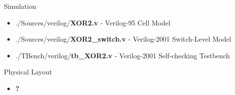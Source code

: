 \begin{center}
    Simulation
    \begin{itemize}
        \item ./Sources/verilog/\textbf{XOR2.v} - Verilog-95 Cell Model
        \item ./Sources/verilog/\textbf{XOR2\_switch.v} - Verilog-2001 Switch-Level Model
        \item ./TBench/verilog/\textbf{tb\_XOR2.v} - Verilog-2001 Self-checking Testbench
    \end{itemize}
    Physical Layout
    \begin{itemize}
        \item \textbf{?}
    \end{itemize}
\end{center}
